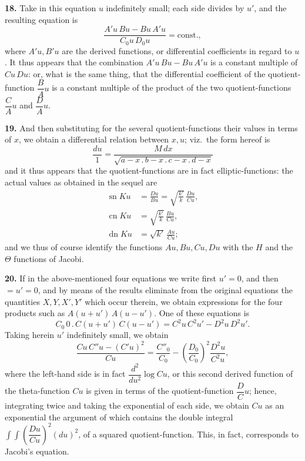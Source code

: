 \documentclass[11pt]{article}
\begin{document}
\medskip

\textbf{18.} Take in this equation $u$ indefinitely small; each side divides by $u'$, and the resulting equation is
\[
\frac{A'u\, Bu - Bu\, A'u}{C_0 u\, D_0 u} = \text{const.},
\]
where $A'u, B'u$ are the derived functions, or differential coefficients in regard to $u$. It thus appears that the combination $A'u\, Bu - Bu\, A'u$ is a constant multiple of $Cu\, Du$: or, what is the same thing, that the differential coefficient of the quotient-function $\dfrac{B}{A}u$ is a constant multiple of the product of the two quotient-functions $\dfrac{C}{A}u$ and $\dfrac{D}{A}u$.

\medskip

\textbf{19.} And then substituting for the several quotient-functions their values in terms of $x$, we obtain a differential relation between $x,u$; viz.\ the form hereof is
\[
\frac{du}{1} = \frac{M\,dx}{\sqrt{a-x\mathbin{.}b-x\mathbin{.}c-x\mathbin{.}d-x}}
\]
and it thus appears that the quotient-functions are in fact elliptic-functions: the actual values as obtained in the sequel are
\begin{align*}
\operatorname{sn} Ku &= \frac{Du}{Bu} = \sqrt{\frac{k'}{k}}\,\frac{Du}{Cu},\\
\operatorname{cn} Ku &= \sqrt{\frac{k'}{k}}\,\frac{Bu}{Cu},\\
\operatorname{dn} Ku &= \sqrt{k'}\,\frac{Au}{Cu};
\end{align*}
and we thus of course identify the functions $Au, Bu, Cu, Du$ with the $H$ and the $\Theta$ functions of Jacobi.

\medskip

\textbf{20.} If in the above-mentioned four equations we write first $u' = 0$, and then $= u' = 0$, and by means of the results eliminate from the original equations the quantities $X,Y,X',Y'$ which occur therein, we obtain expressions for the four products such as $A(u + u')\,A(u - u')$. One of these equations is
\[
C\!_0\, 0\mathbin{.}C(u + u')\,C(u - u') = C^2 u\, C^2 u' - D^2 u\, D^2 u'.
\]
Taking herein $u'$ indefinitely small, we obtain
\[
\frac{Cu\,C''u - (C'u)^2}{Cu} = \frac{C''_0}{C_0} - \left(\frac{D_0}{C_0}\right)^2 \frac{D^2 u}{C^2 u},
\]
where the left-hand side is in fact $\dfrac{d^2}{du^2}\log Cu$, or this second derived function of the theta-function $Cu$ is given in terms of the quotient-function $\dfrac{D}{C}u$; hence, integrating twice and taking the exponential of each side, we obtain $Cu$ as an exponential the argument of which contains the double integral $\int\!\int\!\left(\dfrac{Du}{Cu}\right)^2(du)^2$, of a squared quotient-function. This, in fact, corresponds to Jacobi's equation.
\end{document}
